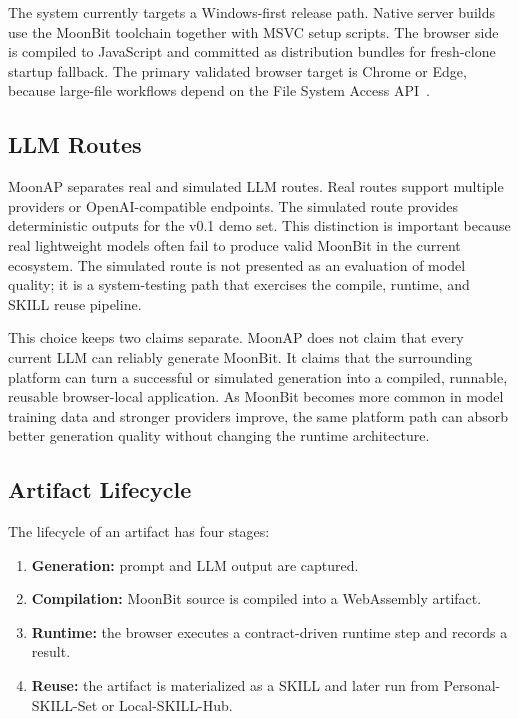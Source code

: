 \documentclass[11pt]{article}
\newcommand{\moonap}{MoonAP}
\newcommand{\skill}{SKILL}
\newcommand{\wasm}{WebAssembly}
\begin{document}
The system currently targets a Windows-first release path. Native server builds use the MoonBit toolchain together with MSVC setup scripts. The browser side is compiled to JavaScript and committed as distribution bundles for fresh-clone startup fallback. The primary validated browser target is Chrome or Edge, because large-file workflows depend on the File System Access API~\cite{file-system-access}.

\subsection{LLM Routes}

\moonap{} separates real and simulated LLM routes. Real routes support multiple providers or OpenAI-compatible endpoints. The simulated route provides deterministic outputs for the v0.1 demo set. This distinction is important because real lightweight models often fail to produce valid MoonBit in the current ecosystem. The simulated route is not presented as an evaluation of model quality; it is a system-testing path that exercises the compile, runtime, and \skill{} reuse pipeline.

This choice keeps two claims separate. \moonap{} does not claim that every current LLM can reliably generate MoonBit. It claims that the surrounding platform can turn a successful or simulated generation into a compiled, runnable, reusable browser-local application. As MoonBit becomes more common in model training data and stronger providers improve, the same platform path can absorb better generation quality without changing the runtime architecture.

\subsection{Artifact Lifecycle}

The lifecycle of an artifact has four stages:

\begin{enumerate}[leftmargin=*]
  \item \textbf{Generation:} prompt and LLM output are captured.
  \item \textbf{Compilation:} MoonBit source is compiled into a \wasm{} artifact.
  \item \textbf{Runtime:} the browser executes a contract-driven runtime step and records a result.
  \item \textbf{Reuse:} the artifact is materialized as a \skill{} and later run from Personal-\skill{}-Set or Local-\skill{}-Hub.
\end{enumerate}
\end{document}
